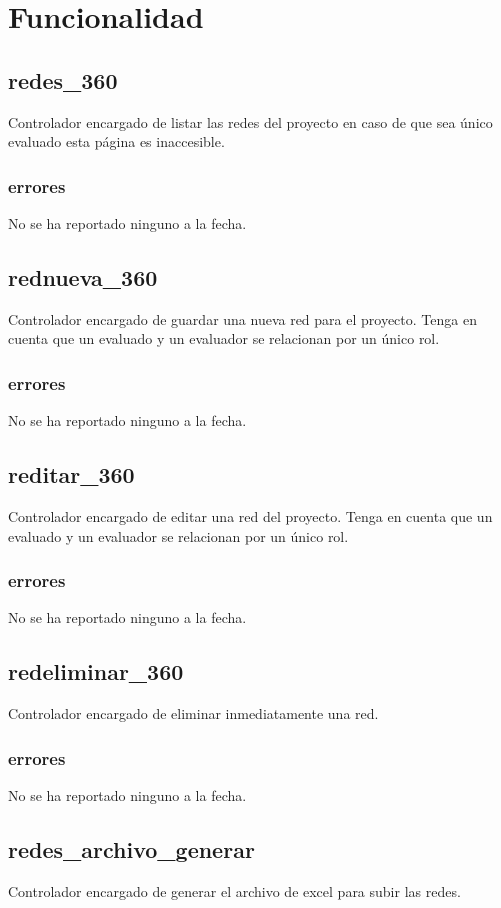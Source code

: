 \documentclass[10pt,a4paper]{book}
\begin{document}
	\section{Funcionalidad}

	\subsection{redes\_360}
	Controlador encargado de listar las redes del proyecto en caso de que sea único evaluado esta página es inaccesible.
	\subsubsection{errores}
	No se ha reportado ninguno a la fecha.

	\subsection{rednueva\_360}
	Controlador encargado de guardar una nueva red para el proyecto. Tenga en cuenta que un evaluado y un evaluador se relacionan por un único rol.
	\subsubsection{errores}
	No se ha reportado ninguno a la fecha.

	\subsection{reditar\_360}
	Controlador encargado de editar una red del proyecto. Tenga en cuenta que un evaluado y un evaluador se relacionan por un único rol.
	\subsubsection{errores}
	No se ha reportado ninguno a la fecha.

	\subsection{redeliminar\_360}
	Controlador encargado de eliminar inmediatamente una red.
	\subsubsection{errores}
	No se ha reportado ninguno a la fecha.

	\subsection{redes\_archivo\_generar}
	Controlador encargado de generar el archivo de excel para subir las redes.
\end{document}

